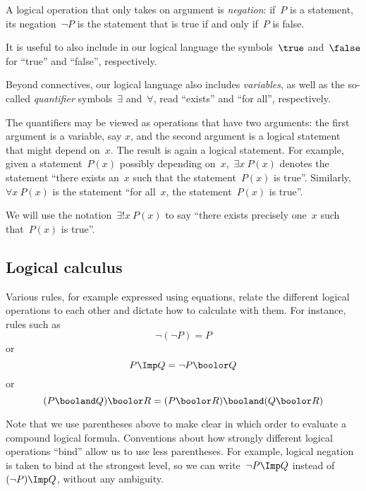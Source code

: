A logical operation that only takes on argument is \emph{negation}: if~$P$ is a statement, its negation~$\lnot P$ is the statement that is true if and only if~$P$ is false.

It is useful to also include in our logical language the symbols~$\true$ and~$\false$ for ``true'' and ``false'', respectively.

Beyond connectives, our logical language also includes \emph{variables}, as well as the so-called \emph{quantifier} symbols~$\exists$ and~$\forall$, read ``exists'' and ``for all'', respectively.

The quantifiers may be viewed as operations that have two arguments: the first argument is a variable, say $x$, and the second argument is a logical statement that might depend on~$x$.
The result is again a logical statement.
For example, given a statement~$P(x)$ possibly depending on~$x$,~$\exists x \ P(x)$ denotes the statement ``there exists an~$x$ such that the statement~$P(x)$ is true''.
Similarly,~$\forall x \ P(x)$ is the statement ``for all~$x$, the statement~$P(x)$ is true''.

We will use the notation~$\exists!
    x \ P(x)$ to say ``there exists precisely one~$x$ such that~$P(x)$ is true''.

\subsection{Logical calculus}

Various rules, for example expressed using equations, relate the different logical operations to each other and dictate how to calculate with them.
For instance, rules such as
\begin{equation*}
    \lnot (\lnot P) = P
\end{equation*}
or
\begin{equation*}
    P \Imp Q = \lnot P \boolor Q
\end{equation*}
or
\begin{equation*}
    (P \booland Q) \boolor R = (P \boolor R) \booland (Q \boolor R)
\end{equation*}

Note that we use parentheses above to make clear in which order to evaluate a compound logical formula.
Conventions about how strongly different logical operations ``bind'' allow us to use less parentheses.
For example, logical negation is taken to bind at the strongest level, so we can write~$\lnot P \Imp Q$ instead of~$(\lnot P) \Imp Q$, without any ambiguity.

